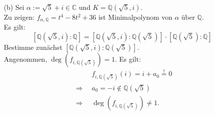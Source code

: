 \documentclass[12pt]{article}
\newcommand{\df}{\enspace\Longrightarrow\enspace}
\newcommand{\grad}{\operatorname{deg}}
\begin{document}
\begin{enumerate}
	\item[(b)] Sei $\alpha:=\sqrt{5}+i\in\mathbb{C}$ und $K=\mathbb{Q}(\sqrt{5},i)$. \\
	Zu zeigen: $f_{\alpha,\mathbb{Q}}=t^4-8t^2+36$ ist Minimalpolynom von $\alpha$ über $\mathbb{Q}$. \\
	Es gilt: $$\left[\mathbb{Q}(\sqrt{5},i):\mathbb{Q}\right]=\left[\mathbb{Q}(\sqrt{5},i):\mathbb{Q}(\sqrt{5})\right]\cdot\left[\mathbb{Q}(\sqrt{5}):\mathbb{Q}\right]$$
	Bestimme zunächst $\left[\mathbb{Q}(\sqrt{5},i):\mathbb{Q}(\sqrt{5})\right]$. \\
	Angenommen, $\grad(f_{i,\mathbb{Q}(\sqrt{5})})=1$. Es gilt:
	\begin{align*}
		&f_{i,\mathbb{Q}(\sqrt{5})}(i)=i+a_0\overset{!}{=}0 \\
		\df&a_0=-i\notin\mathbb{Q}(\sqrt{5}) \\
		\df&\grad(f_{i,\mathbb{Q}(\sqrt{5})})\neq1.
	\end{align*}
	

\end{enumerate}
\end{document}
